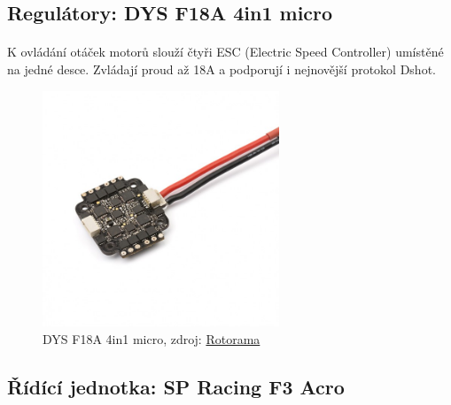 \documentclass[a4paper]{report}
\begin{document}
\subsection{Regulátory: DYS F18A 4in1 micro}
\paragraph{} K ovládání otáček motorů slouží čtyři ESC (Electric Speed Controller) umístěné na jedné desce. Zvládají proud až 18A a podporují i nejnovější protokol Dshot.
\begin{figure}[H]
\centering
\caption{DYS F18A 4in1 micro, zdroj: 
\href{https://www.rotorama.cz/regulatory/dys-f18a-4in1-micro}{Rotorama}}
\includegraphics[width=200pt]{regulatory.jpg}
\end{figure}
\subsection{Řídící jednotka: SP Racing F3 Acro}
\end{document}
